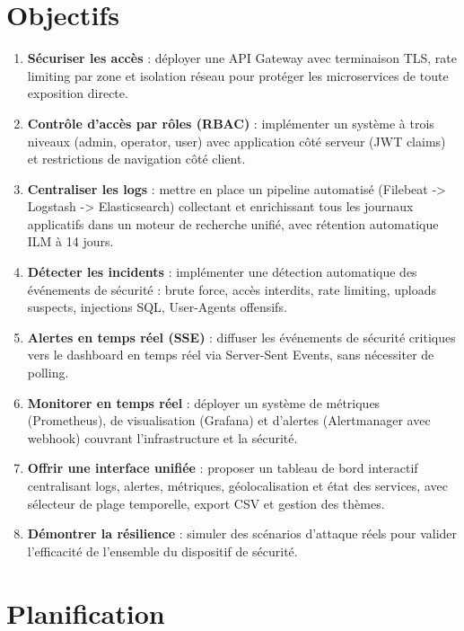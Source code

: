\documentclass[12pt, a4paper]{report}
\begin{document}
\section{Objectifs}

\begin{successbox}
\begin{enumerate}[leftmargin=*]
  \item \textbf{Sécuriser les accès} : déployer une API Gateway avec terminaison TLS, rate limiting par zone et isolation réseau pour protéger les microservices de toute exposition directe.
  \item \textbf{Contrôle d'accès par rôles (RBAC)} : implémenter un système à trois niveaux (admin, operator, user) avec application côté serveur (JWT claims) et restrictions de navigation côté client.
  \item \textbf{Centraliser les logs} : mettre en place un pipeline automatisé (Filebeat -> Logstash -> Elasticsearch) collectant et enrichissant tous les journaux applicatifs dans un moteur de recherche unifié, avec rétention automatique ILM à 14 jours.
  \item \textbf{Détecter les incidents} : implémenter une détection automatique des événements de sécurité : brute force, accès interdits, rate limiting, uploads suspects, injections SQL, User-Agents offensifs.
  \item \textbf{Alertes en temps réel (SSE)} : diffuser les événements de sécurité critiques vers le dashboard en temps réel via Server-Sent Events, sans nécessiter de polling.
  \item \textbf{Monitorer en temps réel} : déployer un système de métriques (Prometheus), de visualisation (Grafana) et d'alertes (Alertmanager avec webhook) couvrant l'infrastructure et la sécurité.
  \item \textbf{Offrir une interface unifiée} : proposer un tableau de bord interactif centralisant logs, alertes, métriques, géolocalisation et état des services, avec sélecteur de plage temporelle, export CSV et gestion des thèmes.
  \item \textbf{Démontrer la résilience} : simuler des scénarios d'attaque réels pour valider l'efficacité de l'ensemble du dispositif de sécurité.
\end{enumerate}
\end{successbox}

\section{Planification}
\end{document}
